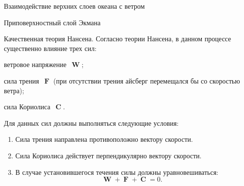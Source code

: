 \begin{chapter}{Взаимодействие верхних слоев океана с ветром}
\begin{section}{Приповерхностный слой Экмана}
\begin{paragraph}{Качественная теория Нансена.}
Согласно теории Нансена, в данном процессе существенно влияние трех сил:
\begin{enumparen}
\item ветровое напряжение~$\mbfW$;
%

\item 
сила трения~$\mbfF$ (при отсутствии трения айсберг перемещался бы со скоростью
ветра);
%

\item 
сила Кориолиса~$\mbfC$.
%
\end{enumparen}
Для данных сил должны выполняться следующие условия:
%
\begin{enumerate}
\item 
Сила трения направлена противоположно вектору скорости.
%

\item 
Сила Кориолиса действует перпендикулярно вектору скорости.
%

\item 
В случае установившегося течения силы должны уравновешиваться:  
\begin{displaymath}
 \mbfW + \mbfF + \mbfC = 0.
\end{displaymath}
%
\end{enumerate}
\end{paragraph}


\end{section}
\end{chapter}
